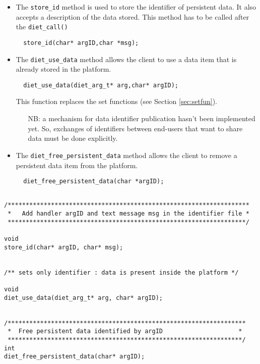 \begin{itemize}
\item {The \texttt{store\_id} method} is used to store the
identifier of persistent data. It also accepts a description of
the data stored. This method has to be called after the
\texttt{diet\_call()}
\begin{verbatim}
  store_id(char* argID,char *msg);
\end{verbatim}

\item The \texttt{diet\_use\_data} method allows the client to use a data
item that is already stored in the platform.
\begin{verbatim}
  diet_use_data(diet_arg_t* arg,char* argID);
\end{verbatim}
This function replaces the set functions (see Section \ref{sec:setfun}).



\begin{itemize}
\item[NB:] a mechanism for data identifier publication hasn't been 
implemented yet. So, exchanges of identifiers between end-users that
want to share data must be done explicitly.
\end{itemize}



\item {The \texttt{diet\_free\_persistent\_data} method} allows the
client to remove a persistent data item from the platform.
\begin{verbatim}
  diet_free_persistent_data(char *argID);
\end{verbatim}

\end{itemize}


{\footnotesize
\begin{verbatim}

/*******************************************************************
 *   Add handler argID and text message msg in the identifier file *
 ******************************************************************/

void 
store_id(char* argID, char* msg);


/** sets only identifier : data is present inside the platform */

void
diet_use_data(diet_arg_t* arg, char* argID);


/******************************************************************
 *  Free persistent data identified by argID                     *
 *****************************************************************/
int
diet_free_persistent_data(char* argID);

\end{verbatim}
}


